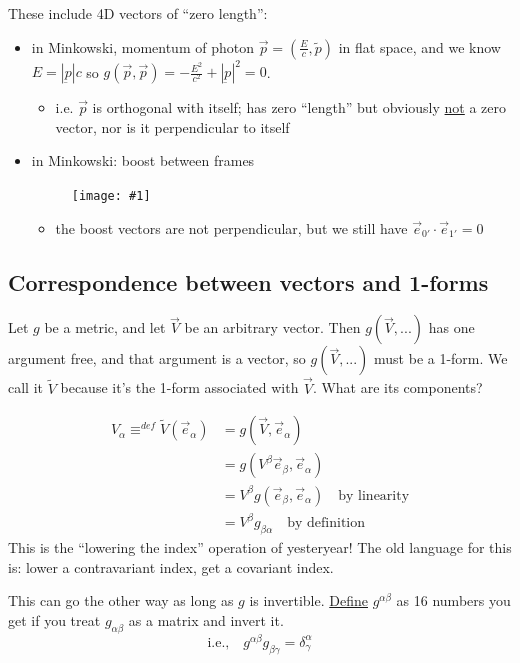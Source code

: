 \documentclass[a4paper]{article} %
\newcommand{\utilde}[1]{\tilde{#1}}
\newcommand{\picturesize}[2]
{
\begin{figure}[h]
\centering
\texttt{[image: \#1]}
\end{figure}
}
\renewcommand{\tilde}{\widetilde}
\begin{document}
These include 4D vectors of ``zero length'':
\begin{itemize}
\item in Minkowski, momentum of photon $\vec{p}=\left(\frac{E}{c},\utilde{p}\right)$ in flat space,
and we know $E=|\underbar{p}|c$ so $g(\vec{p},\vec{p})=-\frac{E^2}{c^2}+|\underbar{p}|^2=0$.
\begin{itemize}
\item i.e. $\vec{p}$ is orthogonal with itself; has zero ``length'' but obviously \underline{not} a zero vector, nor is it perpendicular to itself
\end{itemize}
\item in Minkowski: boost between frames
\picturesize{images/minkowski_boost.png}{0.4}
\begin{itemize}
\item the boost vectors are not perpendicular, but we still have $\vec{e}_{0'}\cdot\vec{e}_{1'}=0$
\end{itemize}
\end{itemize}


\subsection{Correspondence between vectors and 1-forms}

Let $g$ be a metric, and let $\vec{V}$ be an arbitrary vector. Then $g(\vec{V},...)$ has one argument free, and that argument is a vector, so $g(\vec{V},...)$ must be a 1-form. We call it $\tilde{V}$ because it's the 1-form associated with $\vec{V}$. What are its components?

\begin{align*}
V_{\alpha}\equiv^{def}\tilde{V}(\vec{e}_{\alpha})&=g(\vec{V},\vec{e}_{\alpha})\\
&=g(V^{\beta}\vec{e}_{\beta},\vec{e}_{\alpha})\\
&=V^{\beta}g(\vec{e}_{\beta},\vec{e}_{\alpha})\quad\text{by linearity}\\
&=V^{\beta}g_{\beta\alpha}\quad\text{by definition}
\end{align*}
This is the ``lowering the index'' operation of yesteryear! The old language for this is: lower a contravariant index, get a covariant index.

This can go the other way as long as $g$ is invertible. \underline{Define} $g^{\alpha\beta}$ as 16 numbers you get if you treat $g_{\alpha\beta}$ as a matrix and invert it.
\begin{equation}
\text{i.e.,}\quad g^{\alpha\beta}g_{\beta\gamma}=\delta^{\alpha}_{\gamma}
\end{equation}
\end{document}
